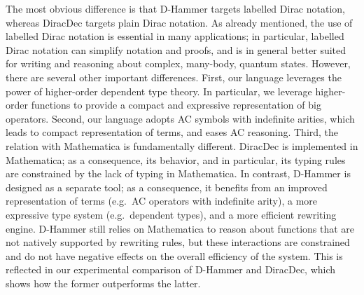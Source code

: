 The most obvious difference is that D-Hammer targets labelled Dirac
notation, whereas DiracDec targets plain Dirac notation. As already
mentioned, the use of labelled Dirac notation is essential in many
applications; in particular, labelled Dirac notation can simplify
notation and proofs, and is in general better suited for writing and
reasoning about complex, many-body, quantum states. However, there are
several other important differences. First, our language leverages the
power of higher-order dependent type theory. In particular, we
leverage higher-order functions to provide a compact and expressive
representation of big operators. Second, our language adopts AC
symbols with indefinite arities, which leads to compact representation
of terms, and eases AC reasoning. Third, the relation with Mathematica
is fundamentally different. DiracDec is implemented in Mathematica; as
a consequence, its behavior, and in particular, its typing rules are
constrained by the lack of typing in Mathematica. In contrast, D-Hammer
is designed as a separate tool; as a consequence, it benefits from an
improved representation of terms (e.g.\, AC operators with indefinite
arity), a more expressive type system (e.g.\, dependent types), and a
more efficient rewriting engine. D-Hammer still relies on Mathematica
to reason about functions that are not natively supported by rewriting
rules, but these interactions are constrained and do not have negative
effects on the overall efficiency of the system. This is reflected in
our experimental comparison of D-Hammer and DiracDec, which shows how
the former outperforms the latter.




